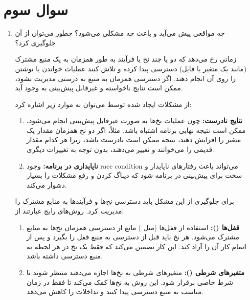 

\section{سوال سوم}

\begin{enumerate}
	\item 
	  چه مواقعی پیش می‌آید و باعث چه مشکلی می‌شود؟ چطور می‌توان از آن جلوگیری کرد؟

	\begin{qsolve}
		 زمانی رخ می‌دهد که دو یا چند نخ یا فرآیند به طور همزمان به یک منبع مشترک (مانند یک متغیر یا فایل) دسترسی پیدا کرده و تلاش کنند عملیات خواندن یا نوشتن را روی آن انجام دهند. اگر دسترسی همزمان به منبع به درستی مدیریت نشود، ممکن است نتایج ناخواسته و غیرقابل پیش‌بینی به وجود آید.
	
	
	از مشکلات ایجاد شده توسط  می‌توان به موارد زیر اشاره کرد:
	
	\begin{enumerate}
		\item 
		\textbf{نتایج نادرست:} چون عملیات نخ‌ها به صورت غیرقابل پیش‌بینی انجام می‌شود، ممکن است نتیجه نهایی برنامه اشتباه باشد. مثلاً، اگر دو نخ همزمان مقدار یک متغیر را افزایش دهند، نتیجه ممکن است نادرست باشد، زیرا هر کدام مقدار قدیمی را می‌خوانند و تغییر می‌دهند، بدون توجه به تغییرات دیگری.
		
		
		\item 
		\textbf{ناپایداری در برنامه:} وجود race condition می‌تواند باعث رفتارهای ناپایدار و سخت برای پیش‌بینی در برنامه شود که دیباگ کردن و رفع مشکلات را بسیار دشوار می‌کند.
	\end{enumerate}
	
	برای جلوگیری از این مشکل باید دسترسی نخ‌ها و فرآیندها به منابع مشترک را مدیریت کرد. روش‌های رایج عبارتند از:
	
	\begin{enumerate}
		\item 
		\textbf{قفل‌ها ():} استفاده از قفل‌ها (مثل ) مانع از دسترسی همزمان نخ‌ها به منابع مشترک می‌شود. هر نخ باید قبل از دسترسی به منبع قفل را بگیرد و پس از اتمام کار آن را آزاد کند. این کار تضمین می‌کند که فقط یک نخ در هر لحظه به منبع دسترسی داشته باشد.
		
		
		\item 
		\textbf{متغیرهای شرطی ():} متغیرهای شرطی به نخ‌ها اجازه می‌دهند منتظر شوند تا شرط خاصی برقرار شود. این روش به نخ‌ها کمک می‌کند تا فقط در زمان مناسب به منبع دسترسی پیدا کنند و تداخلات را کاهش می‌دهد.
		

\end{enumerate}
\end{qsolve}
\end{enumerate}
